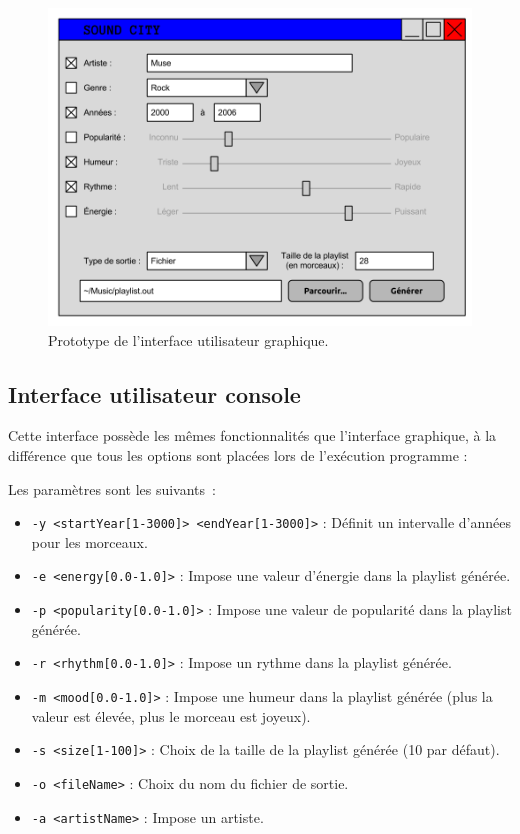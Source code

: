\begin{figure}[H]
\includegraphics[width=\textwidth]{data/besoins/interface_utilisateur.png}
\caption{Prototype de l'interface utilisateur graphique.}
\end{figure}

\subsection{Interface utilisateur console}
\label{besoins:proto:console}

Cette interface possède les mêmes fonctionnalités que l'interface graphique, à 
la différence que tous les options sont placées lors de l'exécution programme :

\vspace{3mm}
\noindent Les paramètres sont les suivants~:
\begin{itemize}
\item \texttt{-y <startYear[1-3000]> <endYear[1-3000]>} : Définit un intervalle 
d'années pour les morceaux.
\item \texttt{-e <energy[0.0-1.0]>} : Impose une valeur d'énergie dans 
la playlist générée.
\item \texttt{-p <popularity[0.0-1.0]>} : Impose une valeur de popularité 
dans la playlist générée.
\item \texttt{-r <rhythm[0.0-1.0]>} : Impose un rythme dans la 
playlist générée.
\item \texttt{-m <mood[0.0-1.0]>} : Impose une humeur dans la 
playlist générée (plus la valeur est élevée, plus le morceau est joyeux).
\item \texttt{-s <size[1-100]>} : Choix de la taille de la 
playlist générée (10 par défaut).
\item \texttt{-o <fileName>} : Choix du nom du fichier de sortie.
\item \texttt{-a <artistName>} : Impose un artiste.
\end{itemize}
